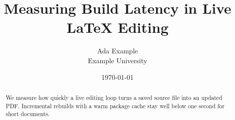 \documentclass[11pt]{article}
\title{Measuring Build Latency in Live \LaTeX{} Editing}
\author{Ada Example \\ \small Example University}
\date{\today}
\begin{document}
\maketitle

\begin{abstract}
We measure how quickly a live editing loop turns a saved source file into an updated PDF.
Incremental rebuilds with a warm package cache stay well below one second for short documents.
\end{abstract}






\end{document}
